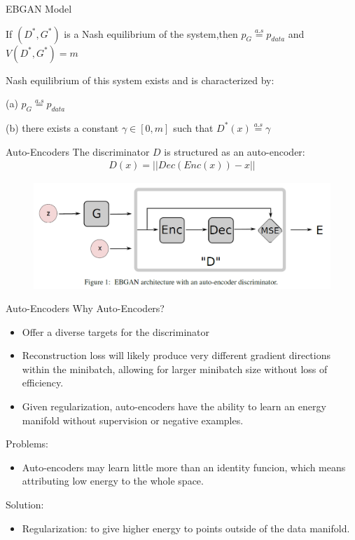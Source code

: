 \documentclass[mathserif]{beamer}
\begin{document}
\begin{frame}{EBGAN Model}
  \begin{theorem}
    If $(D^{*},G^{*})$ is a Nash equilibrium of the system,then $p_{G}\overset{a.s}{=}p_{data}$ and
    $V(D^{*},G^{*})=m$
  \end{theorem}
  \begin{theorem}
    Nash equilibrium of this system exists and is characterized by:

    (a) $p_{G}\overset{a.s}{=}p_{data}$

    (b) there exists a constant $\gamma\in[0,m]$ such that $D^{*}(x)\overset{a.s}{=}\gamma$
  \end{theorem}
\end{frame}
\begin{frame}{Auto-Encoders}
  The discriminator $D$ is structured as an auto-encoder:
  \begin{align}
    D(x)=||Dec(Enc(x))-x||
  \end{align}
  \begin{figure}
    \centering
    \includegraphics[scale=0.5]{fig/1.png}
    \label{}
  \end{figure}
\end{frame}
\begin{frame}{Auto-Encoders}
  Why Auto-Encoders?
  \begin{itemize}
    \item Offer a diverse targets for the discriminator

    \item Reconstruction loss will likely produce very different gradient directions within the minibatch, allowing for larger minibatch size without loss of efficiency.

    \item Given regularization, auto-encoders have the ability to learn an energy manifold without
    supervision or negative examples.
  \end{itemize}
  Problems:
  \begin{itemize}
    \item Auto-encoders may learn little more than an identity funcion, which means attributing low
    energy to the whole space.
  \end{itemize}
  Solution:
  \begin{itemize}
    \item Regularization: to give higher energy to points outside of the data manifold.
  \end{itemize}
\end{frame}
\end{document}

